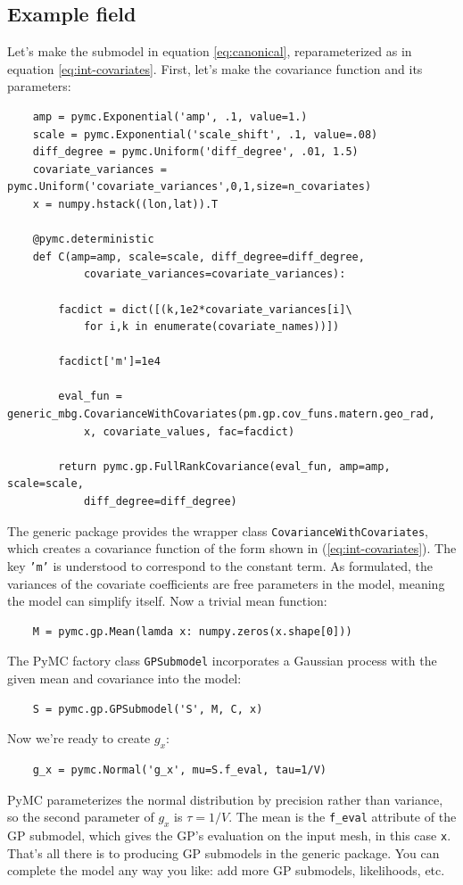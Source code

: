 \subsection{Example field}
\label{sub:example} 

Let's make the submodel in equation \ref{eq:canonical}, reparameterized as in equation \ref{eq:int-covariates}. First, let's make the covariance function and its parameters:
\begin{verbatim}
    amp = pymc.Exponential('amp', .1, value=1.)
    scale = pymc.Exponential('scale_shift', .1, value=.08)
    diff_degree = pymc.Uniform('diff_degree', .01, 1.5)
    covariate_variances = pymc.Uniform('covariate_variances',0,1,size=n_covariates)
    x = numpy.hstack((lon,lat)).T
    
    @pymc.deterministic
    def C(amp=amp, scale=scale, diff_degree=diff_degree, 
            covariate_variances=covariate_variances):

        facdict = dict([(k,1e2*covariate_variances[i]\
            for i,k in enumerate(covariate_names))])
            
        facdict['m']=1e4

        eval_fun = generic_mbg.CovarianceWithCovariates(pm.gp.cov_funs.matern.geo_rad,
            x, covariate_values, fac=facdict)

        return pymc.gp.FullRankCovariance(eval_fun, amp=amp, scale=scale, 
            diff_degree=diff_degree)
\end{verbatim}
The generic package provides the wrapper class \texttt{CovarianceWithCovariates}, which creates a covariance function of the form shown in (\ref{eq:int-covariates}). The key \texttt{'m'} is understood to correspond to the constant term. As formulated, the variances of the covariate coefficients are free parameters in the model, meaning the model can simplify itself. Now a trivial mean function:
\begin{verbatim}
    M = pymc.gp.Mean(lamda x: numpy.zeros(x.shape[0]))
\end{verbatim}

The PyMC factory class \texttt{GPSubmodel} incorporates a Gaussian process with the given mean and covariance into the model:
\begin{verbatim}
    S = pymc.gp.GPSubmodel('S', M, C, x)
\end{verbatim}

Now we're ready to create $g_x$:
\begin{verbatim}
    g_x = pymc.Normal('g_x', mu=S.f_eval, tau=1/V)
\end{verbatim}
PyMC parameterizes the normal distribution by precision rather than variance, so the second parameter of $g_x$ is $\tau=1/V$. The mean is the \texttt{f\_eval} attribute of the GP submodel, which gives the GP's evaluation on the input mesh, in this case \texttt{x}. That's all there is to producing GP submodels in the generic package. You can complete the model any way you like: add more GP submodels, likelihoods, etc.

